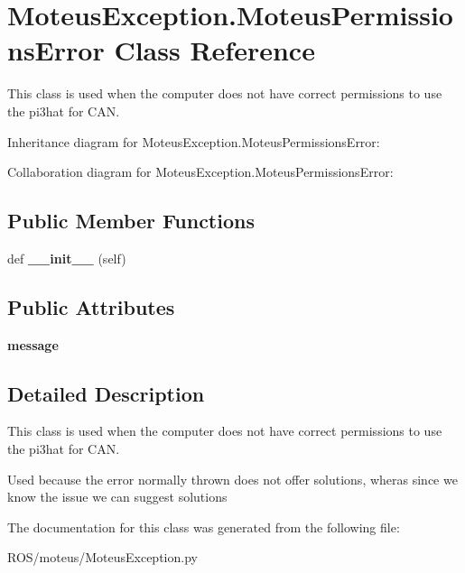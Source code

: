 \hypertarget{classMoteusException_1_1MoteusPermissionsError}{}\section{Moteus\+Exception.\+Moteus\+Permissions\+Error Class Reference}
\label{classMoteusException_1_1MoteusPermissionsError}


This class is used when the computer does not have correct permissions to use the pi3hat for C\+AN.  




Inheritance diagram for Moteus\+Exception.\+Moteus\+Permissions\+Error\+:


Collaboration diagram for Moteus\+Exception.\+Moteus\+Permissions\+Error\+:
\subsection*{Public Member Functions}
\begin{DoxyCompactItemize}
\item 
\mbox{\label{classMoteusException_1_1MoteusPermissionsError_abd158f80b40a37358dad2dee703e5689}} 
def {\bfseries \+\_\+\+\_\+init\+\_\+\+\_\+} (self)
\end{DoxyCompactItemize}
\subsection*{Public Attributes}
\begin{DoxyCompactItemize}
\item 
\mbox{\label{classMoteusException_1_1MoteusPermissionsError_ad46287e9068fe609a2f44ead7de4562a}} 
{\bfseries message}
\end{DoxyCompactItemize}


\subsection{Detailed Description}
This class is used when the computer does not have correct permissions to use the pi3hat for C\+AN. 

Used because the error normally thrown does not offer solutions, wheras since we know the issue we can suggest solutions 

The documentation for this class was generated from the following file\+:\begin{DoxyCompactItemize}
\item 
R\+O\+S/moteus/Moteus\+Exception.\+py\end{DoxyCompactItemize}
